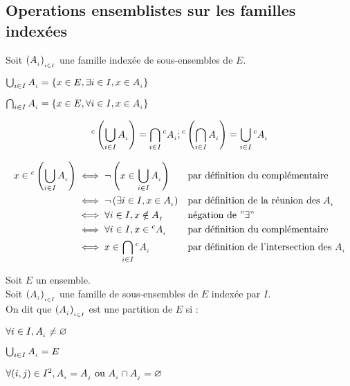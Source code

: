 \documentclass[12pt,twoside,a4paper]{article}
\begin{document}
		\subsection{Operations ensemblistes sur les familles index\'ees}
			\begin{defi}
				Soit $\left(A_{_{i}}\right)_{_{i\in I}}$ une famille index\'ee de sous-ensembles de $E$.
				\begin{liste}
					\item $\bigcup_{i\in I}A_{_{i}}=\left\{x\in E,\exists i\in I,x\in A_{_{i}}\right\}$
					\item $\bigcap_{i\in I}A_{_{i}}=\left\{x\in E,\forall i\in I,x\in A_{_{i}}\right\}$
				\end{liste}
			\end{defi}
			\begin{prop}
				$${^c\left(\bigcup_{i\in I}A_{_{i}}\right)}=\bigcap_{i\in I}{^cA_{_{i}}};{^c\left(\bigcap_{i\in I}A_{_{i}}\right)}=\bigcup_{i\in I}{^cA_{_{i}}}$$
			\end{prop}
			\begin{preuve}
				$$\begin{aligned}
					x\in{^c\left(\bigcup_{i\in I}A_{_{i}}\right)}&\iff\neg\left(x\in\bigcup_{i\in I}A_{_{i}}\right)&&\text{par d\'efinition du compl\'ementaire} \\
													   &\iff\neg\left(\exists i\in I,x\in A_{_{i}}\right)&&\text{par d\'efinition de la r\'eunion des }A_{_{i}} \\
													   &\iff\forall i\in I,x\notin A_{_{I}}&&\text{n\'egation de }"\exists" \\
													   &\iff\forall i\in I,x\in {^cA_{_{i}}}&&\text{par d\'efinition du compl\'ementaire} \\
													   &\iff x\in\bigcap_{i\in I}{^cA_{_{i}}}&&\text{par d\'efinition de l'intersection des }A_{_{i}}
				\end{aligned}$$
			\end{preuve}
			\begin{defi}
				Soit $E$ un ensemble. \\
				Soit $\left(A_{_{i}}\right)_{_{i\in I}}$ une famille de sous-ensembles de $E$ index\'ee par $I$. \\
				On dit que $\left(A_{_{i}}\right)_{_{i\in I}}$ est une partition de $E$ si :
				\begin{liste}
					\item $\forall i\in I,A_{_{i}}\neq\varnothing$
					\item $\bigcup_{i\in I}A_{_{i}}=E$
					\item $\forall(i,j)\in I^2,A_{_{i}}=A_{_{j}}\text{ ou } A_{_{i}}\cap A_{_{j}}=\varnothing$
				\end{liste}
			\end{defi}
\end{document}
